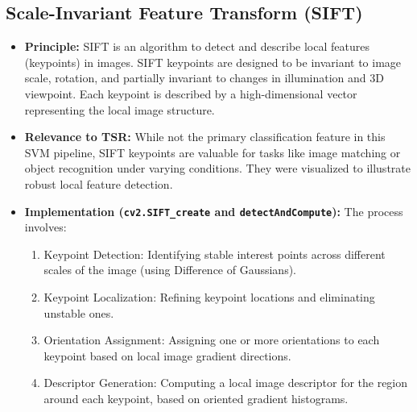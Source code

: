 \documentclass[11pt, a4paper]{article}
\begin{document}
\subsection{Scale-Invariant Feature Transform (SIFT)}
\begin{itemize}
    \item \textbf{Principle:} SIFT is an algorithm to detect and describe local features (keypoints) in images. SIFT keypoints are designed to be invariant to image scale, rotation, and partially invariant to changes in illumination and 3D viewpoint. Each keypoint is described by a high-dimensional vector representing the local image structure.
    \item \textbf{Relevance to TSR:} While not the primary classification feature in this SVM pipeline, SIFT keypoints are valuable for tasks like image matching or object recognition under varying conditions. They were visualized to illustrate robust local feature detection.
    \item \textbf{Implementation (\texttt{cv2.SIFT\_create} and \texttt{detectAndCompute}):}
        The process involves:
        \begin{enumerate}
            \item Keypoint Detection: Identifying stable interest points across different scales of the image (using Difference of Gaussians).
            \item Keypoint Localization: Refining keypoint locations and eliminating unstable ones.
            \item Orientation Assignment: Assigning one or more orientations to each keypoint based on local image gradient directions.
            \item Descriptor Generation: Computing a local image descriptor for the region around each keypoint, based on oriented gradient histograms.
        \end{enumerate}
\end{itemize}
\end{document}
